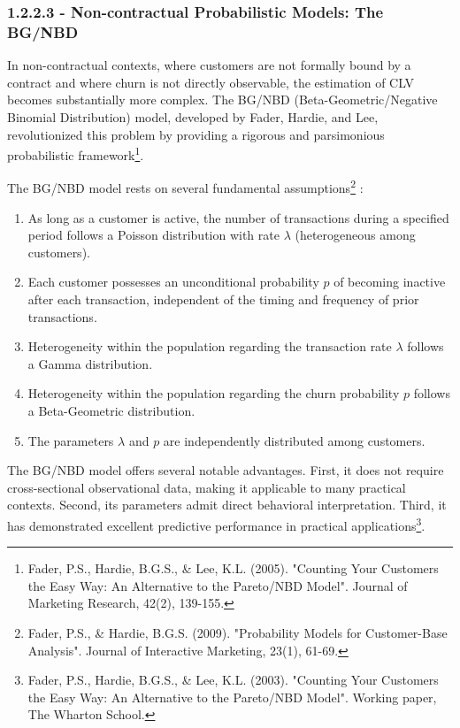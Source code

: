 \documentclass[12pt,a4paper,oneside]{report}
\begin{document}
\subsubsection{1.2.2.3 - Non-contractual Probabilistic Models: The BG/NBD}

In non-contractual contexts, where customers are not formally bound by a contract and where churn is not directly observable, the estimation of CLV becomes substantially more complex. The BG/NBD (Beta-Geometric/Negative Binomial Distribution) model, developed by Fader, Hardie, and Lee, revolutionized this problem by providing a rigorous and parsimonious probabilistic framework\footnote{Fader, P.S., Hardie, B.G.S., \& Lee, K.L. (2005). "Counting Your Customers the Easy Way: An Alternative to the Pareto/NBD Model". Journal of Marketing Research, 42(2), 139-155.}.

The BG/NBD model rests on several fundamental assumptions\footnote{Fader, P.S., \& Hardie, B.G.S. (2009). "Probability Models for Customer-Base Analysis". Journal of Interactive Marketing, 23(1), 61-69.} :

\begin{enumerate}
\item As long as a customer is active, the number of transactions during a specified period follows a Poisson distribution with rate $\lambda$ (heterogeneous among customers).

\item Each customer possesses an unconditional probability $p$ of becoming inactive after each transaction, independent of the timing and frequency of prior transactions.

\item Heterogeneity within the population regarding the transaction rate $\lambda$ follows a Gamma distribution.

\item Heterogeneity within the population regarding the churn probability $p$ follows a Beta-Geometric distribution.

\item The parameters $\lambda$ and $p$ are independently distributed among customers.
\end{enumerate}

The BG/NBD model offers several notable advantages. First, it does not require cross-sectional observational data, making it applicable to many practical contexts. Second, its parameters admit direct behavioral interpretation. Third, it has demonstrated excellent predictive performance in practical applications\footnote{Fader, P.S., Hardie, B.G.S., \& Lee, K.L. (2003). "Counting Your Customers the Easy Way: An Alternative to the Pareto/NBD Model". Working paper, The Wharton School.}.
\end{document}

